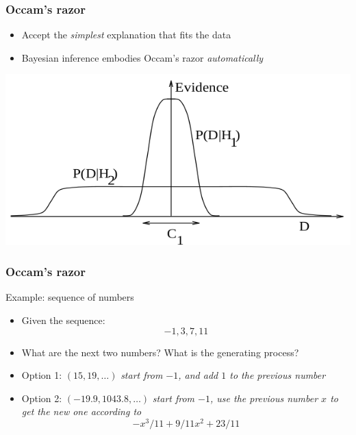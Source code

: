 \documentclass{beamer}
\begin{document}
\begin{frame}
	\frametitle{Occam's razor}
\begin{itemize}
\item Accept the \emph{simplest} explanation that fits the data
\item Bayesian inference embodies Occam's razor \emph{automatically}
\end{itemize}
   \includegraphics[width=\textwidth]{e21}
\end{frame}

\begin{frame}
	\frametitle{Occam's razor}
   \begin{block}{Example: sequence of numbers}
	\begin{itemize}[<+->]
	\item Given the sequence:
	$$-1,3,7,11$$
	\item What are the next two numbers? What is the generating process? 
	\item Option 1: $(15,19, \hdots)$ \emph{start from $-1$, and add $1$ to the previous number}
	\item Option 2: $(-19.9, 1043.8, \hdots)$ \emph{start from $-1$, use the previous number $x$ to get the new one according to}
	$$ -x^3/11 + 9/11x^2 + 23/11$$ 
	\end{itemize}
\end{block}
\end{frame}
\end{document}
